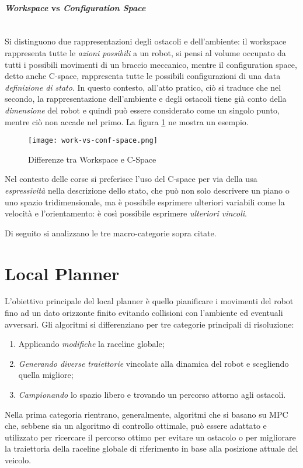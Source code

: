 \paragraph{\textit{Workspace} vs \textit{Configuration Space}} \ \\
Si distinguono due rappresentazioni degli ostacoli e dell'ambiente: il workspace rappresenta tutte le
\textit{azioni possibili} a un robot, si pensi al volume occupato da tutti i possibili movimenti di un
braccio meccanico, mentre il configuration space, detto anche C-space, rappresenta tutte le possibili
configurazioni di una data \textit{definizione di stato}. In questo contesto, all'atto pratico, ciò si
traduce che nel secondo, la rappresentazione dell'ambiente e degli ostacoli tiene già conto della
\textit{dimensione} del robot e quindi può essere considerato come un singolo punto, mentre ciò non
accade nel primo. La figura \ref{fig:work-vs-conf-space} ne mostra un esempio.
\begin{figure}[H]
	\begin{center}
		\texttt{[image: work-vs-conf-space.png]}
	\end{center}
	\caption{Differenze tra Workspace e C-Space \cite{lection11}}
	\label{fig:work-vs-conf-space}
\end{figure}
Nel contesto delle corse si preferisce l'uso del C-space per via della usa \textit{espressività} nella
descrizione dello stato, che può non solo descrivere un piano o uno spazio tridimensionale, ma è
possibile esprimere ulteriori variabili come la velocità e l'orientamento: è così possibile esprimere
\textit{ulteriori vincoli}.

\bigskip
\noindent Di seguito si analizzano le tre macro-categorie sopra citate.

\section{Local Planner}
L'obiettivo principale del local planner è quello pianificare i movimenti del robot fino ad un dato
orizzonte finito evitando collisioni con l'ambiente ed eventuali avversari. Gli algoritmi si
differenziano per tre categorie principali di risoluzione:
\begin{enumerate}
	\item Applicando \textit{modifiche} la raceline globale; 
	\item \textit{Generando diverse traiettorie} vincolate alla dinamica del robot e scegliendo quella migliore;
	\item \textit{Campionando} lo spazio libero e trovando un percorso attorno agli ostacoli.
\end{enumerate}
Nella prima categoria rientrano, generalmente, algoritmi che si basano su MPC che, sebbene sia un
algoritmo di controllo ottimale, può essere adattato e utilizzato per ricercare il percorso ottimo per
evitare un ostacolo o per migliorare la traiettoria della raceline globale di riferimento in base alla
posizione attuale del veicolo.

